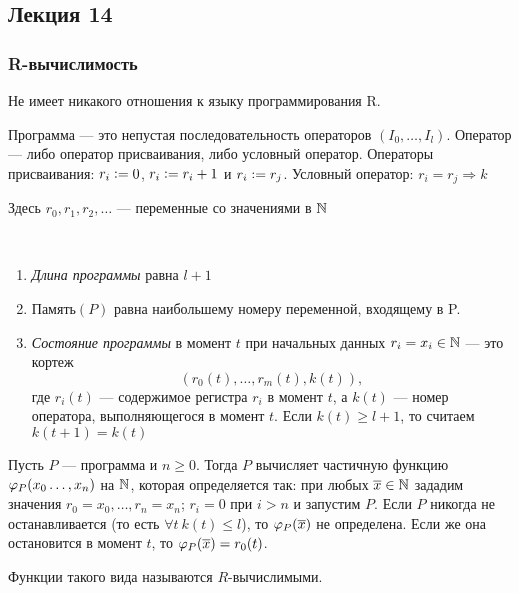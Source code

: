 \subsection*{Лекция 14}

\subsubsection{R-вычислимость}
\begin{remark}
    Не имеет никакого отношения к языку программирования R.
\end{remark}

\begin{definition}
    Программа — это непустая последовательность операторов $(I_0, \dots, I_l)$.
    Оператор — либо оператор присваивания, либо условный оператор.
    Операторы присваивания: $r_i\vcentcolon= 0$, $r_i\vcentcolon= r_i+1$ и $r_i\vcentcolon= r_j$.
    Условный оператор: $r_i=r_j\Rightarrow k$
    
    Здесь $r_0, r_1, r_2, \dots$ — переменные со значениями в ${\mathbb N}$
\end{definition}


\begin{definition}\
    \begin{enumerate}
        \item \emph{Длина программы} равна $l+1$
        \item $\text{Память}(P)$ равна наибольшему номеру переменной, входящему в P.
        \item \emph{Состояние программы} в момент $t$ при начальных данных $r_i=x_i\in {\mathbb N}$ — это кортеж
            $$(r_0(t), \dots, r_m(t), k(t)),$$
            где $r_i(t)$ — содержимое регистра $r_i$ в момент $t$, а $k(t)$ — номер оператора, выполняющегося в момент $t$. Если $k(t)\ge l+1$, то считаем $k(t+1)=k(t)$
    \end{enumerate}
\end{definition}

\begin{definition}
    Пусть $P$ — программа и $n\ge 0$. Тогда $P$ вычисляет частичную функцию $\varphi_P(x_0 \ldots, x_n)$ на ${\mathbb N}$, которая определяется так: при любых $\overline{x}\in{\mathbb N}$ зададим значения $r_0=x_0,\dots,r_n=x_n$; $r_i=0$ при $i>n$ и запустим $P$. Если $P$ никогда не останавливается (то есть $\forall t~k(t)\le l$), то $\varphi_P(\overline{x})$ не определена. Если же она остановится в момент $t$, то $\varphi_P(\overline{x})=r_0(t)$.

    Функции такого вида называются $R$-вычислимыми.
\end{definition}

